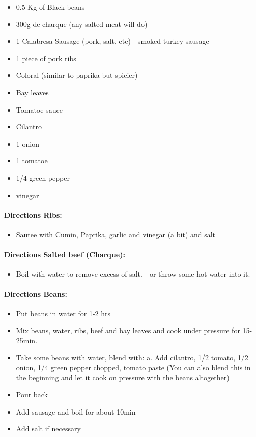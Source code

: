 \documentclass{article}
\begin{document}
\begin{itemize}
	\item 0.5 Kg of Black beans 
	\item 300g de charque (any salted meat will do) 
	\item 1 Calabresa Sausage (pork, salt, etc) - smoked turkey sausage 
	\item 1 piece of pork ribs 
	\item Coloral (similar to paprika but spicier) 
	\item Bay leaves 
	\item Tomatoe sauce 
	\item Cilantro 
	\item 1 onion 
	\item 1 tomatoe 
	\item 1/4 green pepper 
	\item vinegar
\end{itemize}

\paragraph{Directions Ribs:}
\begin{itemize}
	\item Sautee with Cumin, Paprika, garlic and vinegar (a bit) and salt
\end{itemize}

\paragraph{Directions Salted beef (Charque):}
\begin{itemize}
	\item Boil with water to remove excess of salt. - or throw some hot water into it. 
\end{itemize}

\paragraph{Directions Beans:}
\begin{itemize}
	\item Put beans in water for 1-2 hrs
	\item Mix beans, water, ribs, beef and bay leaves and cook under pressure for 15-25min.
	\item Take some beans with water, blend with: a. Add cilantro, 1/2 tomato, 1/2 onion, 1/4 green pepper chopped, tomato paste (You can also blend this in the beginning and let it cook on pressure with the beans altogether)
	\item Pour back
	\item Add sausage and boil for about 10min 
	\item Add salt if necessary
\end{itemize}
\end{document}
